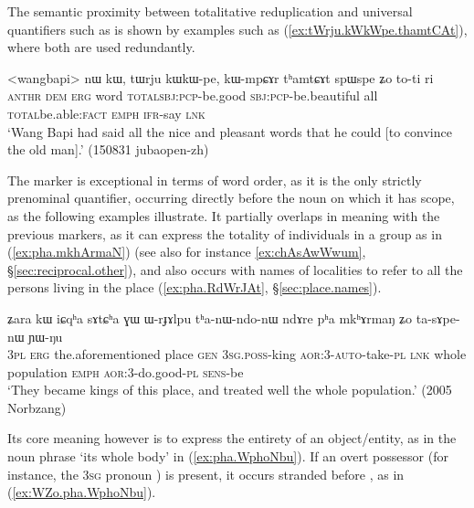 The semantic proximity between totalitative reduplication and universal quantifiers such as  is shown by examples such as (\ref{ex:tWrju.kWkWpe.thamtCAt}), where both are used redundantly.

\begin{exe}
\ex \label{ex:tWrju.kWkWpe.thamtCAt}
\gll   <wangbapi> nɯ kɯ, tɯrju kɯ\redp{}kɯ-pe, kɯ-mpɕɤr tʰamtɕɤt spɯ\redp{}spe ʑo to-ti ri \\
\textsc{anthr} \textsc{dem} \textsc{erg} word \textsc{total}\redp{}\textsc{sbj}:\textsc{pcp}-be.good \textsc{sbj}:\textsc{pcp}-be.beautiful all \textsc{total}\redp{}be.able:\textsc{fact} \textsc{emph} \textsc{ifr}-say \textsc{lnk} \\
\glt `Wang Bapi had said all the nice and pleasant words that he could [to convince the old man].' (150831 jubaopen-zh)
\end{exe}

The marker  is exceptional in terms of word order, as it is the only strictly prenominal quantifier, occurring directly before the noun on which it has scope, as the following examples illustrate. It partially overlaps in meaning with the previous markers, as it can express the totality of individuals in a group as in (\ref{ex:pha.mkhArmaN}) (see also for instance \ref{ex:chAsAwWwum}, §\ref{sec:reciprocal.other}), and also occurs with names of localities to refer to all the persons living in the place (\ref{ex:pha.RdWrJAt}, §\ref{sec:place.names}).

 \begin{exe}
\ex \label{ex:pha.mkhArmaN}
\gll ʑara kɯ iɕqʰa sɤtɕʰa ɣɯ ɯ-rɟɤlpu tʰa-nɯ-ndo-nɯ ndɤre pʰa mkʰɤrmaŋ ʑo ta-sɤpe-nɯ ɲɯ-ŋu \\
\textsc{3pl} \textsc{erg} the.aforementioned place  \textsc{gen} \textsc{3sg}.\textsc{poss}-king \textsc{aor}:3\flobv{}-\textsc{auto}-take-\textsc{pl} \textsc{lnk} whole population \textsc{emph} \textsc{aor}:3\flobv{}-do.good-\textsc{pl} \textsc{sens}-be \\
\glt `They became kings of this place, and treated well the whole population.' (2005 Norbzang)
  \end{exe}
  
Its core meaning however is to express the entirety of an object/entity, as in the noun phrase   `its whole body' in (\ref{ex:pha.WphoNbu}). If an overt possessor (for instance, the \textsc{3sg} pronoun ) is present, it occurs stranded before , as in (\ref{ex:WZo.pha.WphoNbu}).

